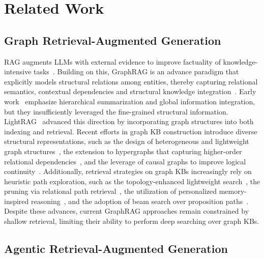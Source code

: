 \section{Related Work}
\subsection{Graph Retrieval-Augmented Generation}
RAG augments LLMs with external evidence to improve factuality of knowledge-intensive tasks~\citep{rag}. Building on this, GraphRAG is an advance paradigm that explicitly models structural relations among entities, thereby capturing relational semantics, contextual dependencies and structural knowledge integration~\citep{graphragsurvey,graphrag}.
Early work~\citep{raptor, graphrag} emphasize hierarchical summarization and global information integration, but they insufficiently leveraged the fine-grained structural information. LightRAG~\citep{lightrag} advanced this direction by incorporating graph structures into both indexing and retrieval.
Recent efforts in graph KB construction introduce diverse structural representations, such as the design of heterogeneous and lightweight graph structures~\citep{minirag, noderag}, the extension to hypergraphs that capturing higher-order relational dependencies~\citep{hypergraphrag, hyperrag}, and the leverage of causal graphs to improve logical continuity~\citep{causalrag}. Additionally, retrieval strategies on graph KBs increasingly rely on heuristic path exploration, such as the topology-enhanced lightweight search~\citep{minirag}, the pruning via relational path retrieval~\citep{pathrag}, the utilization of personalized memory-inspired reasoning~\citep{hipporag, hipporag2}, and the adoption of beam search over proposition paths~\citep{proprag}.
Despite these advances, current GraphRAG approaches remain constrained by shallow retrieval, limiting their ability to perform deep searching over graph KBs.


\subsection{Agentic Retrieval-Augmented Generation}

